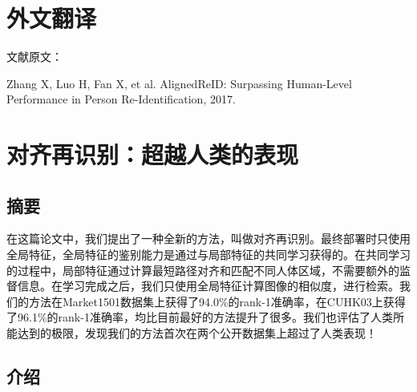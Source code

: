 \chapter{外文翻译}

 {
  \setlength{\parindent}{0em}

  文献原文：

  Zhang X, Luo H, Fan X, et al. AlignedReID: Surpassing Human-Level Performance in Person Re-Identification, 2017. \par

 }

\vspace{2em}

{
	\renewcommand{\cleardoublepage}{}
	\renewcommand{\clearpage}{}
	\titleformat{\chapter}[block]{\sanhao\songti\bfseries\filcenter}{}{0em}{}{}
	\chapter*{对齐再识别：超越人类的表现}
}

\section*{摘要}

在这篇论文中，我们提出了一种全新的方法，叫做对齐再识别。最终部署时只使用全局特征，全局特征的鉴别能力是通过与局部特征的共同学习获得的。在共同学习的过程中，局部特征通过计算最短路径对齐和匹配不同人体区域，不需要额外的监督信息。在学习完成之后，我们只使用全局特征计算图像的相似度，进行检索。我们的方法在Market1501数据集上获得了94.0\%的rank-1准确率，在CUHK03上获得了96.1\%的rank-1准确率，均比目前最好的方法提升了很多。我们也评估了人类所能达到的极限，发现我们的方法首次在两个公开数据集上超过了人类表现！

\section{介绍}

